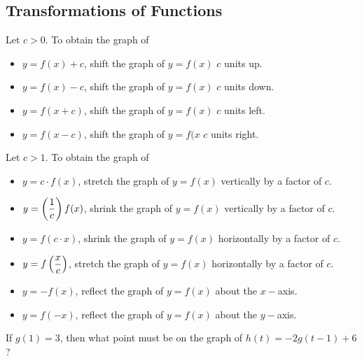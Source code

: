 \documentclass[notes]{subfiles}
\begin{document}
	\subsection*{Transformations of Functions}
		\begin{rmk}
			Let \(c > 0\).  To obtain the graph of
				\begin{itemize}
					\item \(y = f(x) + c\), shift the graph of \(y = f(x)\) \(c\) units up.
					\item \(y = f(x) - c\), shift the graph of \(y = f(x)\) \(c\) units down.
					\item \(y = f(x+c)\), shift the graph of \(y = f(x)\) \(c\) units left.
					\item \(y = f(x-c)\), shift the graph of \(y = f(x\) \(c\) units right.
				\end{itemize}
		\end{rmk}
		\begin{rmk}
			Let \(c > 1\).  To obtain the graph of
				\begin{itemize}
					\item \(y = c\cdot f(x)\), stretch the graph of \(y = f(x)\) vertically by a factor of \(c\).
					\item \(y = \left( \dfrac{1}{c}\right)f(x)\), shrink the graph of \(y = f(x)\) vertically by a factor of \(c\).
					\item \(y = f(c\cdot x)\), shrink the graph of \(y = f(x)\) horizontally by a factor of \(c\).
					\item \(y = f\left( \dfrac{x}{c}\right)\), stretch the graph of \(y = f(x)\) horizontally by a factor of \(c\).
					\item \(y = -f(x)\), reflect the graph of \(y = f(x)\) about the \(x-\)axis.
					\item \(y = f(-x)\), reflect the graph of \(y = f(x)\) about the \(y-\)axis.
				\end{itemize}
		\end{rmk}
		
		\begin{ex}
			If \(g(1) = 3\), then what point must be on the graph of \(h(t) = -2g(t-1) + 6\)?
		\end{ex}
			\newpage
		
\end{document}

